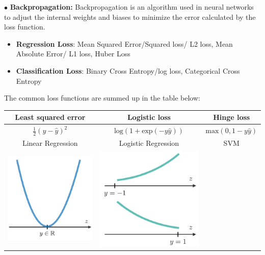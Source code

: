 \documentclass[letterpaper, 10.5pt,landscape]{article}
\begin{document}
\begin{multicols*}{3}
$\bullet$ \textbf{Backpropagation:} Backpropagation is an algorithm used in neural networks to adjust the internal weights and biases to minimize the error calculated by the loss function. 
\vspace{-3pt}
\begin{itemize}[label={--},leftmargin=4mm]
\item \textbf{Regression Loss}: Mean Squared Error/Squared loss/ L2 loss, Mean Absolute Error/ L1 loss, Huber Loss 
\vspace{-3pt}
\item \textbf{Classification Loss}: Binary Cross Entropy/log loss, Categorical Cross Entropy
\vspace{-3pt}
\end{itemize}
The common loss functions are summed up in the table below:
\vspace{-5pt}
\begin{center}
    \begin{tabular}{c|c|c}
            \textbf{Least squared error} & \textbf{Logistic loss} & \textbf{Hinge loss} \\
            \hline
             $\frac{1}{2}(y-\hat{y})^{2}$ & $\text{log}\left(1+\text{exp}(-y\hat{y})\right)$ & $\text{max}(0, 1-y\hat{y})$  \\
            \hline 
            Linear Regression & Logistic Regression & SVM \\
            \hline
            \includegraphics[scale = 0.4]{figures/least_squared_loss_func.PNG} &
            \includegraphics[scale = 0.4]{figures/logistic_loss_func.PNG} &

\end{tabular}
\end{center}
\end{multicols*}
\end{document}
